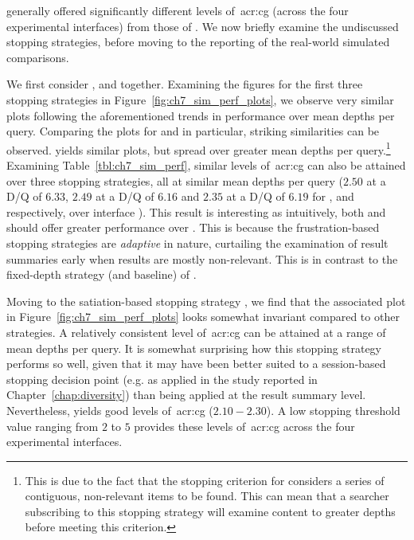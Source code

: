 \noindent
generally offered significantly different levels of~\gls{acr:cg} (across the four experimental interfaces) from those of . We now briefly examine the undiscussed stopping strategies, before moving to the reporting of the real-world simulated comparisons.

We first consider ,  and  together. Examining the figures for the first three stopping strategies in Figure~\ref{fig:ch7_sim_perf_plots}, we observe very similar plots following the aforementioned trends in performance over mean depths per query. Comparing the plots for  and  in particular, striking similarities can be observed.  yields similar plots, but spread over greater mean depths per query.\footnote{This is due to the fact that the stopping criterion for  considers a series of contiguous, non-relevant items to be found. This can mean that a searcher subscribing to this stopping strategy will examine content to greater depths before meeting this criterion.} Examining Table~\ref{tbl:ch7_sim_perf}, similar levels of~\gls{acr:cg} can also be attained over three stopping strategies, all at similar mean depths per query ($2.50$ at a D/Q of $6.33$, $2.49$ at a D/Q of $6.16$ and $2.35$ at a D/Q of $6.19$ for ,  and  respectively, over interface ). This result is interesting as intuitively, both  and  should offer greater performance over . This is because the frustration-based stopping strategies are \emph{adaptive} in nature, curtailing the examination of result summaries early when results are mostly non-relevant. This is in contrast to the fixed-depth strategy (and baseline) of .

Moving to the satiation-based stopping strategy , we find that the associated plot in Figure~\ref{fig:ch7_sim_perf_plots} looks somewhat invariant compared to other strategies. A relatively consistent level of~\gls{acr:cg} can be attained at a range of mean depths per query. It is somewhat surprising how this stopping strategy performs so well, given that it may have been better suited to a session-based stopping decision point (e.g. as applied in the study reported in Chapter~\ref{chap:diversity}) than being applied at the result summary level. Nevertheless,  yields good levels of~\gls{acr:cg} ($2.10-2.30$). A low stopping threshold value ranging from $2$ to $5$ provides these levels of~\gls{acr:cg} across the four experimental interfaces.


